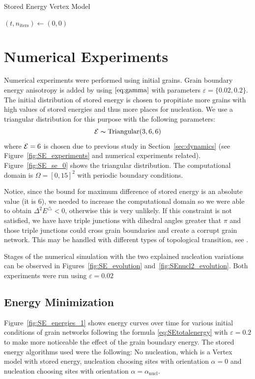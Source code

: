 \begin{algorithm}[t]
\caption{Stored Energy Vertex Model}
\label{alg:storedenergy}
\begin{algorithmic}[1]
\State $(t, n_\text{iters}) \gets (0, 0)$

\EndProcedure
\end{algorithmic}
\end{algorithm}

\section{Numerical Experiments}

Numerical experiments were performed using  initial grains. 
Grain boundary energy anisotropy is added by using $\eqref{eq:gamma}$ with parameters $\varepsilon = \{0.02, 0.2\}$. 
The initial distribution of stored energy is chosen to propitiate more grains with high values of stored energies and thus more places for nucleation. 
We use a triangular distribution for this purpose with the following parameters:
\begin{equation}
    \mathcal{E} \thicksim \text{Triangular}(3,6,6)
    \label{eq:triangular_dist}
\end{equation}
where $\mathcal{E} = 6$ is chosen due to previous study in Section~\ref{sec:dynamics} (see Figure~\ref{fig:SE_experiments} and numerical experiments related). 
Figure~\ref{fig:SE_se_0} shows the triangular distribution. 
The computational domain is $\Omega = [0,15]^2$ with periodic boundary conditions.

Notice, since the bound for maximum difference of
stored energy is an absolute value (it is $6$), 
we needed to increase the computational domain
so we were able to obtain $\Delta^2 E^{\triangle}<0$,
otherwise this is very unlikely.
If this constraint is not satisfied,
we have have triple junctions with dihedral
angles greater that $\pi$ and
those triple junctions could cross grain
boundaries and create a corrupt grain
network. 
This may be handled with different
types of topological transition, see \cite{pikekos2008stochastic}.

Stages of the numerical simulation with the two explained nucleation variations can be observed in Figures~\ref{fig:SE_evolution} and~\ref{fig:SEnucl2_evolution}. 
Both experiments were run using $\varepsilon = 0.02$

\subsection{Energy Minimization}
Figure~\ref{fig:SE_energies_1} shows energy curves over time for various initial conditions of grain networks following the formula \eqref{eq:SEtotalenergy} with $\varepsilon = 0.2$ to make more noticeable the effect of the grain boundary energy. 
The stored energy algorithms used were the following: No nucleation, which is a Vertex model with stored energy, nucleation choosing sites with orientation $\alpha = 0$ and nucleation choosing sites with orientation $\alpha = \alpha_{\text{nucl}}$.

